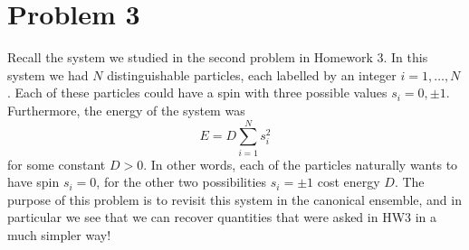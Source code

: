 \documentclass[10pt]{article}
\begin{document}
	\section*{Problem 3} 
	Recall the system we studied in the second problem in Homework 3. In this system we had \(N\) 
	distinguishable particles, each labelled by an integer \(i = 1, \dots, N\). Each of these particles could 
	have a spin with three possible values \(s_i = 0, \pm 1\). Furthermore, the energy of the system was 
	\[
		E = D \sum_{i = 1}^{N} s_i^2
	\] 
	for some constant \(D > 0\). In other words, each of the particles naturally wants to have spin \(s_i = 0\), 
	for the other two possibilities \(s_i = \pm 1\) cost energy \(D\). The purpose of this problem is to revisit
	this system in the canonical ensemble, and in particular we see that we can recover quantities that were 
	asked in HW3 in a much simpler way!
\end{document}
